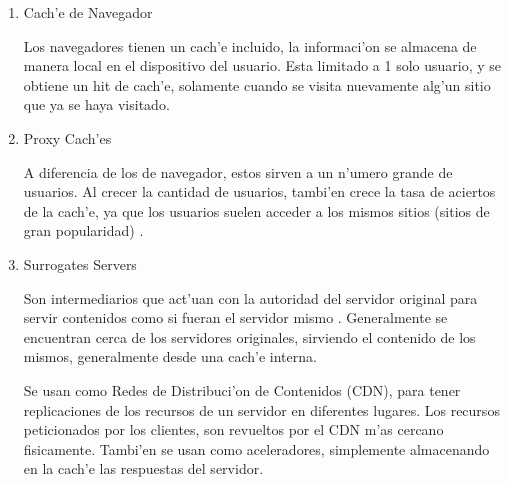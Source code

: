 \begin{enumerate}
\item Cach'e de Navegador

Los navegadores tienen un cach'e incluido, la informaci'on se almacena de manera local en el dispositivo del usuario. Esta limitado a 1 solo usuario, y se obtiene un hit de cach'e, solamente cuando se visita nuevamente alg'un sitio que ya se haya visitado.
\item Proxy Cach'es

A diferencia de los de navegador, estos sirven a un n'umero grande de usuarios. Al crecer la cantidad de usuarios, tambi'en crece la tasa de aciertos de la cach'e, ya que los usuarios suelen acceder a los mismos sitios (sitios de gran popularidad) \citep{duska}.
\item Surrogates Servers

Son intermediarios que act'uan con la autoridad del servidor original para servir contenidos como si fueran el servidor mismo \citep{edgeArch}. Generalmente se encuentran cerca de los servidores originales, sirviendo el contenido de los mismos, generalmente desde una cach'e interna.

Se usan como Redes de Distribuci'on de Contenidos (CDN), para tener replicaciones de los recursos de un servidor en diferentes lugares. Los recursos peticionados por los clientes, son revueltos por el CDN m'as cercano fisicamente. Tambi'en se usan como aceleradores, simplemente almacenando en la cach'e las respuestas del servidor.
\end{enumerate}

